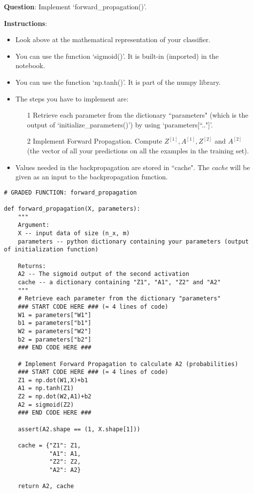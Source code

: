 \label{section4.3}


{\textbf {Question}}: Implement `forward\_propagation()'.

{\textbf {Instructions}}:
\begin{itemize}
\item Look above at the mathematical representation of your classifier.
\item You can use the function `sigmoid()'. It is built-in (imported) in the notebook.
\item You can use the function `np.tanh()'. It is part of the numpy library.
\item The steps you have to implement are:
\begin{itemize}
    \item[1] Retrieve each parameter from the dictionary ``parameters" (which is the output of `initialize\_parameters()') by using `parameters[``.."]'.
    \item[2] Implement Forward Propagation. Compute $Z^{[1]}, A^{[1]}, Z^{[2]}$ and $A^{[2]}$ (the vector of all your predictions on all the examples in the training set).
\end{itemize}    
\item Values needed in the backpropagation are stored in ``cache". The \emph{cache} will be given as an input to the backpropagation function.
\end{itemize}



\begin{verbatim}
# GRADED FUNCTION: forward_propagation

def forward_propagation(X, parameters):
    """
    Argument:
    X -- input data of size (n_x, m)
    parameters -- python dictionary containing your parameters (output of initialization function)
    
    Returns:
    A2 -- The sigmoid output of the second activation
    cache -- a dictionary containing "Z1", "A1", "Z2" and "A2"
    """
    # Retrieve each parameter from the dictionary "parameters"
    ### START CODE HERE ### (≈ 4 lines of code)
    W1 = parameters["W1"]
    b1 = parameters["b1"]
    W2 = parameters["W2"]
    b2 = parameters["b2"]
    ### END CODE HERE ###
    
    # Implement Forward Propagation to calculate A2 (probabilities)
    ### START CODE HERE ### (≈ 4 lines of code)
    Z1 = np.dot(W1,X)+b1
    A1 = np.tanh(Z1)
    Z2 = np.dot(W2,A1)+b2
    A2 = sigmoid(Z2)
    ### END CODE HERE ###
    
    assert(A2.shape == (1, X.shape[1]))
    
    cache = {"Z1": Z1,
             "A1": A1,
             "Z2": Z2,
             "A2": A2}
    
    return A2, cache
\end{verbatim}



